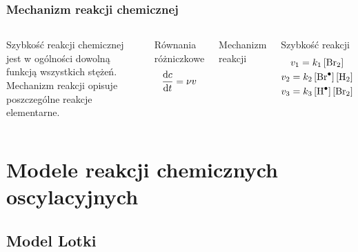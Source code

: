 \documentclass{beamer}
\begin{document}
\begin{frame}
\frametitle{Mechanizm reakcji chemicznej}
\begin{columns}
Szybkość reakcji chemicznej jest w ogólności dowolną funkcją wszystkich stężeń. Mechanizm reakcji opisuje poszczególne reakcje elementarne.
\begin{block}{Równania różniczkowe}
\begin{gather*}
\dv{c}{t} = \nu v
\end{gather*}
\end{block}
\begin{block}{Mechanizm reakcji}
\begin{center}
 \\
 \\
\end{center}
\end{block}
\begin{block}{Szybkość reakcji}
\begin{gather*}
v_{1} = k_{1}\left[\ce{Br2}\right] \\
v_{2} = k_{2}\left[\ce{Br^{.}}\right]\left[\ce{H2}\right] \\
v_{3} = k_{3}\left[\ce{H^{.}}\right]\left[\ce{Br2}\right]
\end{gather*}
\end{block}
\end{columns}
\end{frame}

\section{Modele reakcji chemicznych oscylacyjnych}
\subsection{Model Lotki}
\end{document}
